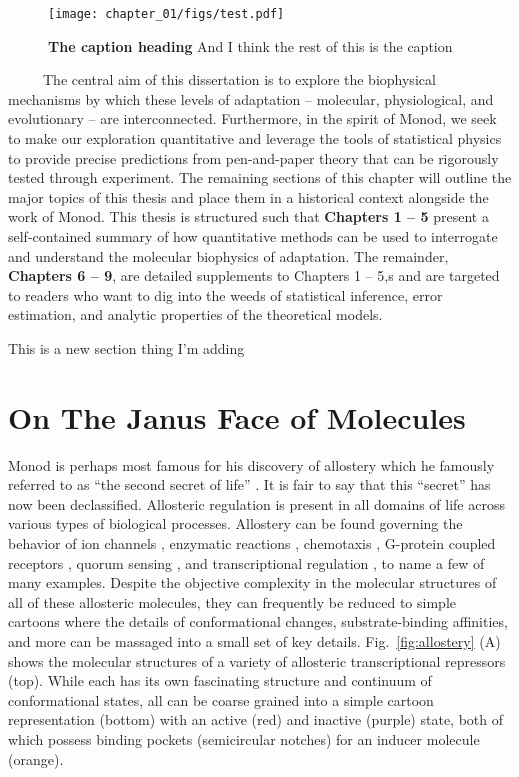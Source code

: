 \documentclass[12pt]{caltech_thesis}
\begin{document}
\hypertarget{fig:custom_second_figure}{%
\begin{figure}
\centering
\texttt{[image: chapter\_01/figs/test.pdf]}
\caption[{The second first caption.}]{\textbf{The caption heading} And I
think the rest of this is the caption}
\label{fig:custom_second_figure}
\end{figure}
}

~~~~~The central aim of this dissertation is to explore the biophysical
mechanisms by which these levels of adaptation -- molecular,
physiological, and evolutionary -- are interconnected. Furthermore, in
the spirit of Monod, we seek to make our exploration quantitative and
leverage the tools of statistical physics to provide precise predictions
from pen-and-paper theory that can be rigorously tested through
experiment. The remaining sections of this chapter will outline the
major topics of this thesis and place them in a historical context
alongside the work of Monod. This thesis is structured such that
\textbf{Chapters 1 -- 5} present a self-contained summary of how
quantitative methods can be used to interrogate and understand the
molecular biophysics of adaptation. The remainder, \textbf{Chapters 6 --
9}, are detailed supplements to Chapters 1 -- 5,s and are targeted to
readers who want to dig into the weeds of statistical inference, error
estimation, and analytic properties of the theoretical models.

This is a new section thing I'm adding

\hypertarget{on-the-janus-face-of-molecules}{%
\section{On The Janus Face of
Molecules}\label{on-the-janus-face-of-molecules}}

Monod is perhaps most famous for his discovery of allostery which he
famously referred to as ``the second secret of life''
\autocite{ullmann2011,monod1965}. It is fair to say that this ``secret''
has now been declassified. Allosteric regulation is present in all
domains of life across various types of biological processes. Allostery
can be found governing the behavior of ion channels
\autocite{einav2017,auerbach2012}, enzymatic reactions
\autocite{einav2016}, chemotaxis \autocite{keymer2006}, G-protein
coupled receptors \autocite{canals2012}, quorum sensing
\autocite{swem2008}, and transcriptional regulation
\autocite{huang2018,lindsley2006a}, to name a few of many examples.
Despite the objective complexity in the molecular structures of all of
these allosteric molecules, they can frequently be reduced to simple
cartoons where the details of conformational changes, substrate-binding
affinities, and more can be massaged into a small set of key details.
Fig.~\ref{fig:allostery} (A) shows the molecular structures of a variety
of allosteric transcriptional repressors (top). While each has its own
fascinating structure and continuum of conformational states, all can be
coarse grained into a simple cartoon representation (bottom) with an
active (red) and inactive (purple) state, both of which possess binding
pockets (semicircular notches) for an inducer molecule (orange).
\end{document}
